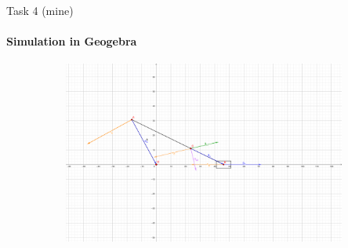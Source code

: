 \documentclass[aspectratio=169,xcolor=table,10pt, notes=hide]{beamer}
\begin{document}
\begin{frame}[t]{Task 4 (mine)}
    \framesubtitle{Simulation in Geogebra}
    \begin{figure}[H]
        \href{https://www.geogebra.org/calculator/jukgsc8y}{
            \centering\includegraphics[height=6cm,width=1\textwidth,keepaspectratio]{image25.png}}
        \label{fig:image25.png}
    \end{figure}
\end{frame}
\end{document}
